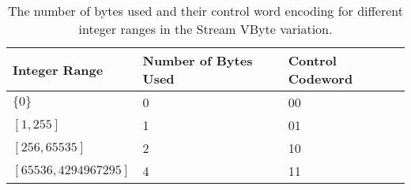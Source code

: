 \begin{table}
    \caption{The number of bytes used and their control word encoding for different integer ranges in the Stream VByte variation. \label{tab:svb-0based}}
    \begin{tabular}{|l|l|l|}%
        \hline
        Integer Range & Number of Bytes Used & Control Codeword\\
        \hline
	$\{0\}$ & 0 & 00\\
	$[1,255]$ & 1 & 01\\
	$[256,65535]$ & 2 & 10\\
	$[65536,4294967295]$ & 4 & 11\\
        \hline
    \end{tabular}
\end{table}
